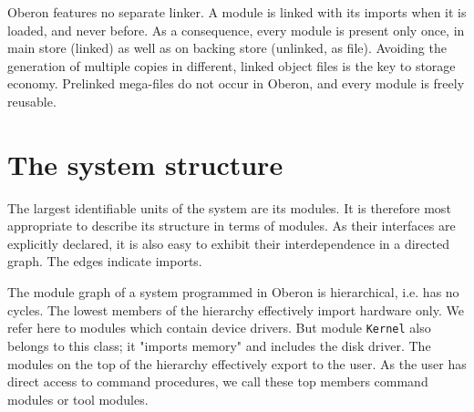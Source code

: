 Oberon features no separate linker. A module is linked with its imports when it is loaded,
and never before. As a consequence, every module is present only once, in main store
(linked) as well as on backing store (unlinked, as file). Avoiding the generation
of multiple copies in different, linked object files is the key to storage economy.
Prelinked mega-files do not occur in Oberon, and every module is freely reusable.

\section{The system structure}
\label{sec:systruct}
The largest identifiable units of the system are its modules. It is therefore most appropriate
to describe its structure in terms of modules. As their interfaces are explicitly declared, it
is also easy to exhibit their interdependence in a directed graph. The edges indicate imports.

The module graph of a system programmed in Oberon is hierarchical, i.e. has no cycles. The
lowest members of the hierarchy effectively import hardware only. We refer here to modules
which contain device drivers. But module \verb|Kernel| also belongs to this class; it
"imports memory" and includes the disk driver. The modules on the top of the hierarchy
effectively export to the user. As the user has direct access to command procedures, we
call these top members command modules or tool modules.

